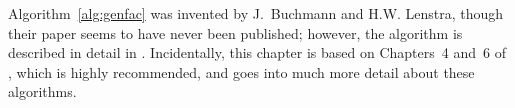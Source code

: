 Algorithm~\ref{alg:genfac} was invented by J.~Buchmann and
H.\thinspace{}W. Lenstra, though their paper seems to have never been
published; however, the algorithm is described in detail in
\cite[\S6.2.5]{cohen:course_ant}.  Incidentally, this chapter is based
on Chapters~4 and~6 of \cite{cohen:course_ant}, which is highly
recommended, and goes into much more detail about these algorithms.




%
%
%
%
%
%



